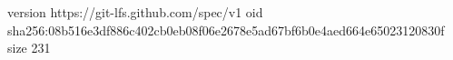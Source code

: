 version https://git-lfs.github.com/spec/v1
oid sha256:08b516e3df886c402cb0eb08f06e2678e5ad67bf6b0e4aed664e65023120830f
size 231
